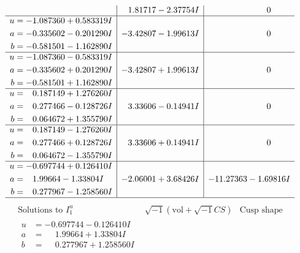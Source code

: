 \documentclass[1p]{elsarticle_modified}
\theoremstyle{definition}
\newcommand{\I}{\sqrt{-1}}
\begin{document}
$$\begin{array}{c|c|c}
 & \phantom{-}1.81717 - 2.37754 I & \phantom{-0.000000 } 0 \\ \hline\begin{aligned}
u &= -1.087360 + 0.583319 I \\
a &= -0.335602 - 0.201290 I \\
b &= -0.581501 - 1.162890 I\end{aligned}
 & -3.42807 - 1.99613 I & \phantom{-0.000000 } 0 \\ \hline\begin{aligned}
u &= -1.087360 - 0.583319 I \\
a &= -0.335602 + 0.201290 I \\
b &= -0.581501 + 1.162890 I\end{aligned}
 & -3.42807 + 1.99613 I & \phantom{-0.000000 } 0 \\ \hline\begin{aligned}
u &= \phantom{-}0.187149 + 1.276260 I \\
a &= \phantom{-}0.277466 - 0.128726 I \\
b &= \phantom{-}0.064672 + 1.355790 I\end{aligned}
 & \phantom{-}3.33606 - 0.14941 I & \phantom{-0.000000 } 0 \\ \hline\begin{aligned}
u &= \phantom{-}0.187149 - 1.276260 I \\
a &= \phantom{-}0.277466 + 0.128726 I \\
b &= \phantom{-}0.064672 - 1.355790 I\end{aligned}
 & \phantom{-}3.33606 + 0.14941 I & \phantom{-0.000000 } 0 \\ \hline\begin{aligned}
u &= -0.697744 + 0.126410 I \\
a &= \phantom{-}1.99664 - 1.33804 I \\
b &= \phantom{-}0.277967 - 1.258560 I\end{aligned}
 & -2.06001 + 3.68426 I & -11.27363 - 1.69816 I\\
 \hline 
 \end{array}$$\newpage$$\begin{array}{c|c|c}  
\text{Solutions to }I^u_{1}& \I (\text{vol} + \sqrt{-1}CS) & \text{Cusp shape}\\
 \hline 
\begin{aligned}
u &= -0.697744 - 0.126410 I \\
a &= \phantom{-}1.99664 + 1.33804 I \\
b &= \phantom{-}0.277967 + 1.258560 I\end{aligned}

\end{array}$$
\end{document}
